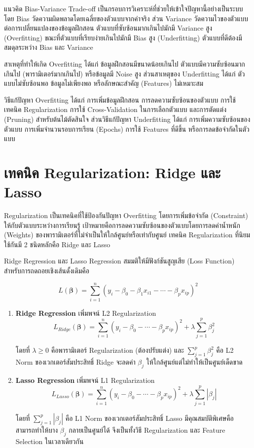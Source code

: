 แนวคิด Bias-Variance Trade-off เป็นกรอบการวิเคราะห์ที่ช่วยให้เข้าใจปัญหานี้อย่างเป็นระบบ โดย Bias วัดความผิดพลาดโดยเฉลี่ยของตัวแบบจากค่าจริง ส่วน Variance วัดความไวของตัวแบบต่อการเปลี่ยนแปลงของข้อมูลฝึกสอน ตัวแบบที่ซับซ้อนมากเกินไปมักมี Variance สูง (Overfitting) ขณะที่ตัวแบบที่เรียบง่ายเกินไปมักมี Bias สูง (Underfitting) ตัวแบบที่ดีต้องมีสมดุลระหว่าง Bias และ Variance

สาเหตุที่ทำให้เกิด Overfitting ได้แก่ ข้อมูลฝึกสอนมีขนาดน้อยเกินไป ตัวแบบมีความซับซ้อนมากเกินไป (พารามิเตอร์มากเกินไป) หรือข้อมูลมี Noise สูง ส่วนสาเหตุของ Underfitting ได้แก่ ตัวแบบไม่ซับซ้อนพอ ข้อมูลไม่เพียงพอ หรือลักษณะสำคัญ (Features) ไม่เหมาะสม

วิธีแก้ปัญหา Overfitting ได้แก่ การเพิ่มข้อมูลฝึกสอน การลดความซับซ้อนของตัวแบบ การใช้เทคนิค Regularization การใช้ Cross-Validation ในการเลือกตัวแบบ และการตัดแต่ง (Pruning) สำหรับต้นไม้ตัดสินใจ ส่วนวิธีแก้ปัญหา Underfitting ได้แก่ การเพิ่มความซับซ้อนของตัวแบบ การเพิ่มจำนวนรอบการเรียน (Epochs) การใช้ Features ที่ดีขึ้น หรือการลดข้อจำกัดในตัวแบบ

\section{เทคนิค Regularization: Ridge และ Lasso}
Regularization เป็นเทคนิคที่ใช้ป้องกันปัญหา Overfitting โดยการเพิ่มข้อจำกัด (Constraint) ให้กับตัวแบบระหว่างการเรียนรู้ เป้าหมายคือการลดความซับซ้อนของตัวแบบโดยการลดค่าน้ำหนัก (Weights) ของพารามิเตอร์ที่ไม่จำเป็นให้ใกล้ศูนย์หรือเท่ากับศูนย์ เทคนิค Regularization ที่นิยมใช้กันมี 2 ชนิดหลักคือ Ridge และ Lasso

\begin{myBox}[]{Ridge Regression และ Lasso Regression}{}
สมมติให้มีฟังก์ชันสูญเสีย (Loss Function) สำหรับการถดถอยเชิงเส้นดั้งเดิมคือ

$$L(\boldsymbol{\beta}) = \sum_{i=1}^{n}(y_i - \beta_0 - \beta_1 x_{i1} - \cdots - \beta_p x_{ip})^2$$

\begin{enumerate}
\item \textbf{Ridge Regression} เพิ่มพจน์ L2 Regularization
$$L_{Ridge}(\boldsymbol{\beta}) = \sum_{i=1}^{n}(y_i - \beta_0 - \cdots - \beta_p x_{ip})^2 + \lambda\sum_{j=1}^{p}\beta_j^2$$

โดยที่ $\lambda \geq 0$ คือพารามิเตอร์ Regularization (ต้องปรับแต่ง) และ $\sum_{j=1}^{p}\beta_j^2$ คือ L2 Norm ของเวกเตอร์สัมประสิทธิ์ Ridge จะลดค่า $\beta_j$ ให้ใกล้ศูนย์แต่ไม่ทำให้เป็นศูนย์เด็ดขาด

\item \textbf{Lasso Regression} เพิ่มพจน์ L1 Regularization
$$L_{Lasso}(\boldsymbol{\beta}) = \sum_{i=1}^{n}(y_i - \beta_0 - \cdots - \beta_p x_{ip})^2 + \lambda\sum_{j=1}^{p}|\beta_j|$$

โดยที่ $\sum_{j=1}^{p}|\beta_j|$ คือ L1 Norm ของเวกเตอร์สัมประสิทธิ์ Lasso มีคุณสมบัติพิเศษคือสามารถทำให้บาง $\beta_j$ กลายเป็นศูนย์ได้ จึงเป็นทั้งวิธี Regularization และ Feature Selection ในเวลาเดียวกัน
\end{enumerate}
\end{myBox}

